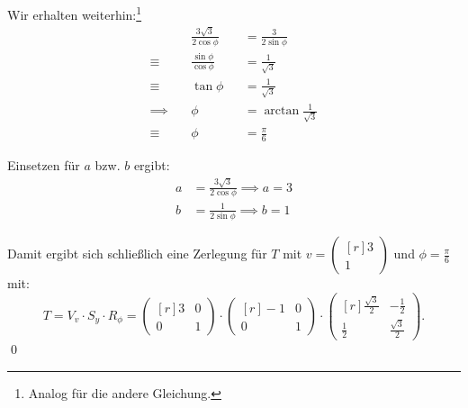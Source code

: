 \documentclass[answers]{exam}
\newcommand{\vektor}[1]{\begin{pmatrix*}[r] #1 \end{pmatrix*}}
\begin{document}
\begin{questions}
\begin{solution}
        Wir erhalten weiterhin:\footnote{Analog für die andere Gleichung.}
        $$
            \begin{aligned}
                               & \frac{3\sqrt{3}}{2\cos\phi} &  & = \frac{3}{2\sin\phi}        \\
                \equiv \quad   & \frac{\sin\phi}{\cos\phi}   &  & = \frac{1}{\sqrt{3}}         \\
                \equiv \quad   & \tan\phi                    &  & = \frac{1}{\sqrt{3}}         \\
                \implies \quad & \phi                        &  & = \arctan \frac{1}{\sqrt{3}} \\
                \equiv \quad   & \phi                        &  & = \frac{\pi}{6}
            \end{aligned}
        $$

        Einsetzen für $a$ bzw. $b$ ergibt:
        $$
            \begin{aligned}
                a & = \frac{3\sqrt{3}}{2\cos\phi} \implies a = 3 \\
                b & = \frac{1}{2\sin\phi} \implies b = 1
            \end{aligned}
        $$

        Damit ergibt sich schließlich eine Zerlegung für $T$ mit $v = \vektor{3\\1}$ und $\phi = \frac{\pi}{6}$ mit:
        $$
            T = V_{v} \cdot S_y \cdot R_\phi = \vektor{3 & 0 \\ 0 & 1} \cdot \vektor{-1 & 0 \\ 0 & 1} \cdot \vektor{\frac{\sqrt{3}}{2} & -\frac{1}{2} \\ \frac{1}{2} & \frac{\sqrt{3}}{2}}.
        $$\qed
    \end{solution}
\end{questions}
\end{document}
